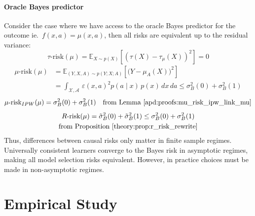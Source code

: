 \documentclass[10pt]{article}
\begin{document}
\begin{multicols}{2}
    \paragraph{Oracle Bayes predictor}\label{remark:bayes_oracle} Consider the case
    where we have access to the oracle Bayes predictor for the outcome ie.~$f(x,
        a)=\mu(x, a)$, then all risks are equivalent up to the residual variance:
    \begin{equation}
        \tau\text{-risk}(\mu) = \mathbb E_{X\sim p(X)}[(\tau(X) - \tau_{\mu}(X))^2] = 0
    \end{equation}
    \begin{align}
        \mu\text{-risk}(\mu) & = \mathbb E_{(Y, X, A) \sim p(Y;X;A)}[\big( Y - \mu_A(X)\big)^2] \\
                             & = \int_{\mathcal X, \mathcal A}
        \,\varepsilon(x,a)^2 p(a \mid x) \,p(x) \,dx\,da  \leq \sigma_B^{2}(0) + \sigma_B^{2}(1) \nonumber
    \end{align}
    \begin{equation}
        \mu\text{-risk}_{IPW}(\mu) = \sigma_B^{2}(0) + \sigma_B^{2}(1)  \quad \text{from Lemma \ref{apd:proofs:mu_risk_ipw_link_mu}}
    \end{equation}
    \begin{multline}
        R\text{-risk}(\mu) = \tilde{\sigma}_B^{2}(0) + \tilde{\sigma}_B^{2}(1)
        \leq \sigma_B^{2}(0) + \sigma_B^{2}(1)  \\  \text{from Proposition \ref{theory:prop:r_risk_rewrite}}%
    \end{multline}
    Thus, differences between causal risks only matter in finite sample regimes.
    Universally consistent learners converge to the Bayes risk in asymptotic
    regimes, making all model selection risks equivalent. However, in practice
    choices must be made in non-asymptotic regimes.

    \section{Empirical Study}\label{sec:empirical_study}



\end{multicols}
\end{document}
